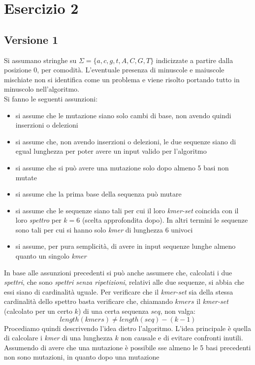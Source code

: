 \documentclass[a4paper,12pt, oneside]{book}
\begin{document}
\chapter{Esercizio 2}
\section{Versione 1}
Si assumano stringhe su $\Sigma=\{a,c,g,t,A,C,G,T\}$
indicizzate a partire dalla posizione 0, per comodità. L'eventuale presenza di
minuscole e maiuscole mischiate non si identifica come un problema e viene
risolto portando tutto in minuscolo nell'algoritmo.\\
Si fanno le seguenti assunzioni:
\begin{itemize}
  \item si assume che le mutazione siano solo cambi di base, non avendo quindi
  inserzioni o delezioni
  \item si assume che, non avendo inserzioni o delezioni, le due sequenze siano
  di egual lunghezza per poter avere un input valido per l'algoritmo
  \item si assume che si può avere una mutazione solo dopo almeno 5 basi non
  mutate 
  \item si assume che la prima base della sequenza può mutare
  \item si assume che le sequenze siano tali per cui il loro \textit{kmer-set}
  coincida con il loro \textit{spettro} per $k=6$ (scelta approfondita dopo). In
  altri termini le sequenze 
  sono tali per cui si hanno solo \textit{kmer} di lunghezza 6 univoci
  \item si assume, per pura semplicità, di avere in input sequenze lunghe almeno
  quanto un singolo \textit{kmer}
\end{itemize}
In base alle assunzioni precedenti si può anche assumere che, calcolati i due
\textit{spettri}, che sono \textit{spettri senza ripetizioni}, relativi alle due
sequenze, si abbia che essi siano di cardinalità uguale. Per verificare che il
\textit{kmer-set} sia della stessa cardinalità dello spettro basta verificare
che, chiamando $kmers$ il \textit{kmer-set} (calcolato per un certo $k$) di una
certa sequenza $seq$, non valga: 
\[length(kmers) \neq length(seq)-(k-1)\]
Procediamo quindi descrivendo l'idea dietro l'algoritmo. L'idea principale è
quella di calcolare i \textit{kmer} di una lunghezza $k$ non causale e di
evitare confronti inutili. Assumendo di avere che una mutazione è possibile sse
almeno le 5 basi precedenti non sono mutazioni, in quanto dopo una mutazione
\end{document}

